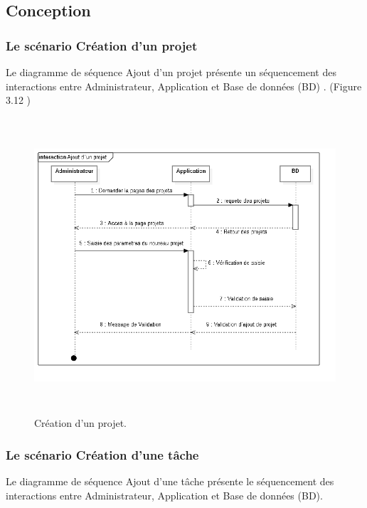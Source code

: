 \subsection{Conception}
\subsubsection{  Le sc\'{e}nario \guillemotleft{} Cr\'{e}ation d'un projet \guillemotright{}}

Le diagramme de s\'{e}quence \guillemotleft{} Ajout d'un projet \guillemotright{} pr\'{e}sente un s\'{e}quencement
des interactions entre Administrateur, Application et Base de donn\'{e}es (BD) . (Figure 3.12 )


\begin{figure}[H]
\center
\includegraphics[width=14cm,height=11cm]{./figures/seq/B.png}
\caption{ Cr\'{e}ation d'un projet.}
\end{figure}

\newpage
\subsubsection{Le sc\'{e}nario \guillemotleft{} Cr\'{e}ation d'une t\^{a}che\guillemotright{}}
Le diagramme de s\'{e}quence \guillemotleft{} Ajout d'une t\^{a}che \guillemotright{} pr\'{e}sente le s\'{e}quencement
des interactions entre Administrateur, Application et Base de donn\'{e}es (BD).

